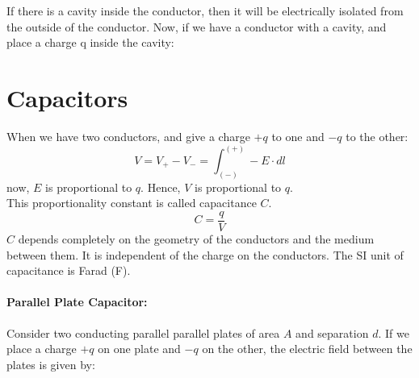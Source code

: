 \documentclass{article}
\begin{document}
If there is a cavity inside the conductor, then it will be electrically isolated from the outside of the conductor.
Now, if we have a conductor with a cavity, and place a charge q inside the cavity:\\


\section{Capacitors}
When we have two conductors, and give a charge $+q$ to one and $-q$ to the other:
\[ V = V_{+} - V_{-} = \int_{(-)}^{(+)} -E\cdot dl\]
now, $E$ is proportional to $q$. Hence, $V$ is proportional to $q$.\\
This proportionality constant is called capacitance $C$.
\[ C = \frac{q}{V} \]
$C$ depends completely on the geometry of the conductors and the medium between them. 
It is independent of the charge on the conductors.
The SI unit of capacitance is Farad (F).\\
\paragraph{Parallel Plate Capacitor:}
Consider two conducting parallel parallel plates of area $A$ and separation $d$. 
If we place a charge $+q$ on one plate and $-q$ on the other, the electric field between the plates is given by:
\end{document}
